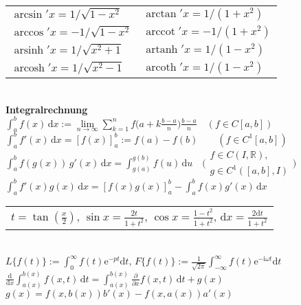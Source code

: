 \documentclass[a4paper,10pt,fleqn,twoside,twocolumn,dvipdfmx]{scrartcl}
\newcommand{\ee}{\mathrm e}
\newcommand{\ui}{\mathrm i}
\newcommand{\R}{\mathbb R}
\newcommand{\strong}[1]{\textsf{\textbf{#1}}}
\newcommand{\ds}{\displaystyle}
\newcommand{\arccot}{\operatorname{arccot}}
\newcommand{\arsinh}{\operatorname{arsinh}}
\newcommand{\arcosh}{\operatorname{arcosh}}
\newcommand{\artanh}{\operatorname{artanh}}
\newcommand{\arcoth}{\operatorname{arcoth}}
\begin{document}
\begin{tabular}{@{}l|l}
$\arcsin'x = 1/\sqrt{1-x^2}$ & $\arctan'x = 1/(1+x^2)$\\
$\arccos'x = -1/\sqrt{1-x^2}$ & $\arccot'x = -1/(1+x^2)$\\ 
$\arsinh'x = 1/\sqrt{x^2+1}$ & $\artanh'x = 1/(1-x^2)$\\
$\arcosh'x = 1/\sqrt{x^2-1}$ & $\arcoth'x = 1/(1-x^2)$
\end{tabular}\\[4pt]
\strong{Integralrechnung}\\
$\int_a^b f(x)\,\mathrm dx
:= \lim\limits_{n\to\infty}\sum_{k=1}^n
f\!\big(a+k\frac{b-a}{n}\big)\frac{b-a}{n}\quad (f\in C[a,b])$\\
$\int_a^b f'(x)\,\mathrm dx = [f(x)]_a^b := f(a)-f(b)\qquad (f\in C^1[a,b])$\\
$\int_a^b f(g(x))\,g'(x)\,\mathrm dx = \int_{g(a)}^{g(b)} f(u)\,\mathrm du\quad
\Big(\begin{smallmatrix}f\in C(I,\R),\\ g\in C^1([a,b],I)\end{smallmatrix}\Big)$\\
$\int_a^b\! f'(x)g(x)\,\mathrm dx = [f(x)g(x)]_a^b-\int_a^b\! f(x)g'(x)\,\mathrm dx$%
\;\\
\begin{tabular}{@{}l}
$t=\tan(\frac{x}{2})$,\; $\sin x = \frac{2t}{1+t^2}$,\;
$\cos x = \frac{1-t^2}{1+t^2}$,\; $\mathrm dx = \frac{2\mathrm dt}{1+t^2}$
\end{tabular}\\
$L\{f(t)\} := \int_0^{\infty}\! f(t)\ee^{-pt}\mathrm dt$,\;
$F\{f(t)\} := \frac{1}{\sqrt{2\pi}}\int_{-\infty}^{\infty}
f(t)\ee^{-\ui\omega t}\mathrm dt$\\
$\ds\frac{\mathrm d}{\mathrm dx}\int_{a(x)}^{b(x)} f(x,t)\,\mathrm dt
= \int_{a(x)}^{b(x)} \frac{\partial}{\partial x}f(x,t)\,\mathrm dt+g(x)$\\
$g(x) = f(x,b(x))b'(x) - f(x,a(x))a'(x)$
\end{document}
